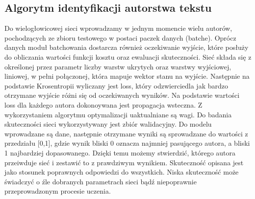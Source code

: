 \subsection{Algorytm identyfikacji autorstwa tekstu}

Do wielogłowicowej sieci wprowadzamy w jednym momencie wielu autorów, pochodzących ze zbioru 
testowego w postaci paczek danych (batche). Oprócz danych moduł batchowania dostarcza również 
oczekiwanie wyjście, które posłuży do obliczania wartości funkcji kosztu oraz ewaluacji skuteczności. 
Sieć składa się z określonej przez parametr liczby warstw ukrytych oraz warstwy wyjściowej, 
liniowej, w pełni połączonej, która mapuje wektor stanu na wyjście. Następnie na podstawie 
Krosentropii wyliczany jest loss, który odzwierciedla jak bardzo otrzymane wyjście różni się od oczekiwanych 
wyników. Na podstawie wartości loss dla każdego autora dokonoywana jest propagacja wsteczna. 
Z wykorzystaniem algorytmu optymalizacji uaktualniane są wagi. 
\newline
\newline
Do badania skuteczności sieci wykorzystywany jest zbiór walidacyjny. Do modelu wprowadzane są dane, 
następnie otrzymane wyniki są sprowadzane do wartości z przedziału [0,1], 
gdzie wynik bliski 0 oznacza najmniej pasującego autora, a bliski 1 najbardziej dopasowanego.
Dzięki temu możemy stwierdzić, którego autora przeiwduje sieć i zestawić to z prawdziwym wynikiem.
Skuteczność opisana jest jako stosunek poprawnych odpowiedzi do wszystkich. Niska skuteczność może 
świadczyć o źle dobranych parametrach sieci bądź niepoprawnie przeprowadzonym procesie uczenia.